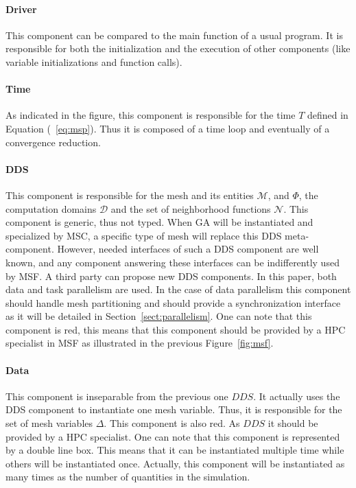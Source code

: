 \paragraph{\textbf{Driver}}
This component can be compared to the main function of a usual program. It is responsible for both the initialization and the execution of other components (like variable initializations and function calls).

\paragraph{\textbf{Time}}
As indicated in the figure, this component is responsible for the time $T$ defined in Equation (~\ref{eq:msp}). Thus it is composed of a time loop and eventually of a convergence reduction.

\paragraph{\textbf{DDS}}
This component is responsible for the mesh and its entities $\mathcal{M}$, and $\Phi$, the computation domains $\mathcal{D}$ and the set of neighborhood functions $\mathcal{N}$. This component is generic, thus not typed. When GA will be instantiated and specialized by MSC, a specific type of mesh will replace this DDS meta-component. However, needed interfaces of such a DDS component are well known, and any component answering these interfaces can be indifferently used by MSF. A third party can propose new DDS components. In this paper, both data and task parallelism are used. In the case of data parallelism this component should handle mesh partitioning and should provide a synchronization interface as it will be detailed in Section~\ref{sect:parallelism}. One can note that this component is red, this means that this component should be provided by a HPC specialist in MSF as illustrated in the previous Figure~\ref{fig:msf}.

\paragraph{\textbf{Data}}
This component is inseparable from the previous one $DDS$. It actually uses the DDS component to instantiate one mesh variable. Thus, it is responsible for the set of mesh variables $\Delta$. This component is also red. As $DDS$ it should be provided by a HPC specialist. One can note that this component is represented by a double line box. This means that it can be instantiated multiple time while others will be instantiated once. Actually, this component will be instantiated as many times as the number of quantities in the simulation.

